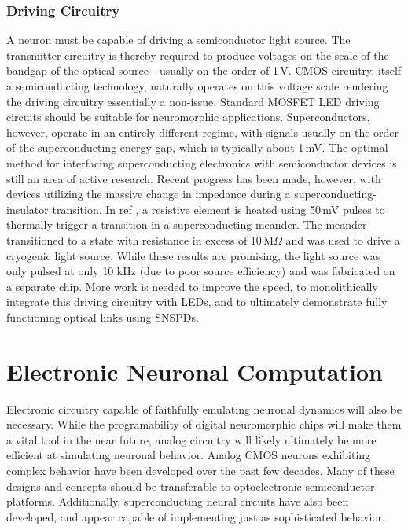 \documentclass[twocolumn]{article}
\begin{document}
\subsubsection{Driving Circuitry}
A neuron must be capable of driving a semiconductor light source. The transmitter circuitry is thereby required to produce voltages on the scale of the bandgap of the optical source - usually on the order of 1\,V. CMOS circuitry, itself a semiconducting technology, naturally operates on this voltage scale rendering the driving circuitry essentially a non-issue. Standard MOSFET LED driving circuits should be suitable for neuromorphic applications. Superconductors, however, operate in an entirely different regime, with signals usually on the order of the superconducting energy gap, which is typically about 1\,mV. The optimal method for interfacing superconducting electronics with semiconductor devices is still an area of active research. Recent progress has been made, however, with devices utilizing the massive change in impedance during a superconducting-insulator transition. In ref \cite{mccaughan2019superconducting}, a resistive element is heated using 50\,mV pulses to thermally trigger a transition in a superconducting meander. The meander transitioned to a state with resistance in excess of 10\,M$\Omega$ and was used to drive a cryogenic light source. While these results are promising, the light source was only pulsed at only 10 kHz (due to poor source efficiency) and was fabricated on a separate chip. More work is needed to improve the speed, to monolithically integrate this driving circuitry with LEDs, and to ultimately demonstrate fully functioning optical links using SNSPDs.

\section{\label{sec:soma}Electronic Neuronal Computation}
Electronic circuitry capable of faithfully emulating neuronal dynamics will also be necessary. While the programability of digital neuromorphic chips will make them a vital tool in the near future, analog circuitry will likely ultimately be more efficient at simulating neuronal behavior. Analog CMOS neurons exhibiting complex behavior have been developed over the past few decades. Many of these designs and concepts should be transferable to optoelectronic semiconductor platforms. Additionally, superconducting neural circuits have also been developed, and appear capable of implementing just as sophisticated behavior.
\end{document}
